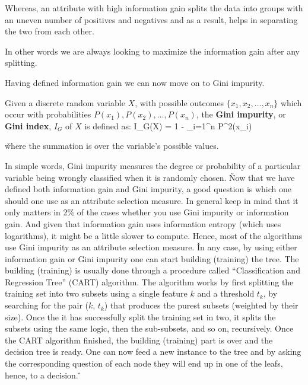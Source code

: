 
Whereas, an attribute with high information gain splits the data into groups with an uneven number of positives and
negatives and as a result, helps in separating the two from each other.


In other words we are always looking to maximize the information gain after any splitting.
\ee

Having defined information gain we can now move on to Gini impurity.

Given a discrete random variable $X$, with possible outcomes $\{x_{1}, x_{2}, \ldots, x_{n} \}$ which occur with
probabilities $ P(x_{1}), P(x_{2}), \ldots, P(x_{n})$, the \textbf{Gini impurity}, or \textbf{Gini index}, $I_{G}$ of
$X$ is defined as:
\bse
I_{G}(X) = 1 - \sum _{i=1}^{n} P^2(x_{i})
\ese

\v

where the summation is over the variable's possible values.
\ed

In simple words, Gini impurity measures the degree or probability of a particular variable being wrongly classified
when it is randomly chosen.  \v

Now that we have defined both information gain and Gini impurity, a good question is which one should one use as an
attribute selection measure. In general keep in mind that it only matters in 2\% of the cases whether you use Gini
impurity or information gain. And given that information gain uses information entropy (which uses logarithms), it
might be a little slower to compute. Hence, most of the algorithms use Gini impurity as an attribute selection
measure. \v

In any case, by using either information gain or Gini impurity one can start building (training) the tree. The
building (training) is usually done through a procedure called ``Classification and Regression Tree'' (CART)
algorithm. The algorithm works by first splitting the training set into two subsets using a single feature $k$ and a
threshold $t_k$, by searching for the pair ($k$, $t_k$) that produces the purest subsets (weighted by their size).
Once the it has successfully split the training set in two, it splits the subsets using the same logic, then the
sub-subsets, and so on, recursively. Once the CART algorithm finished, the building (training) part is over and the
decision tree is ready. One can now feed a new instance to the tree and by asking the corresponding question of each
node they will end up in one of the leafs, hence, to a decision. \v

